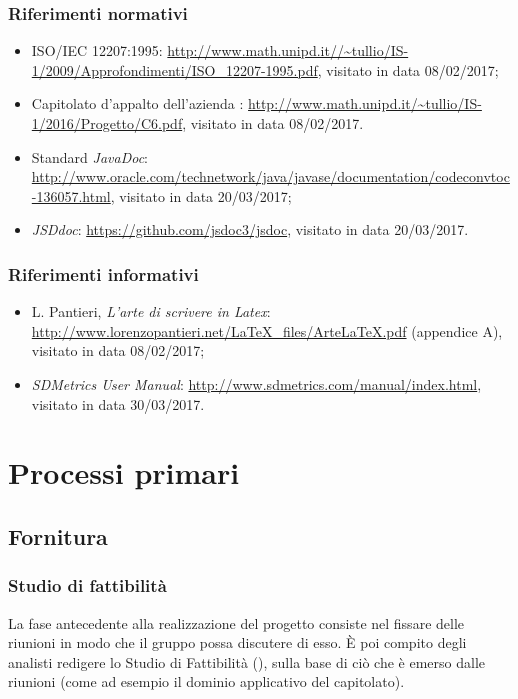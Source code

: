 \subsubsection{Riferimenti normativi}
\begin{itemize}
	\item ISO/IEC 12207:1995: \url{http://www.math.unipd.it//~tullio/IS-1/2009/Approfondimenti/ISO_12207-1995.pdf}, visitato in data 08/02/2017;
	\item Capitolato d'appalto dell'azienda \ZU: \url{http://www.math.unipd.it/~tullio/IS-1/2016/Progetto/C6.pdf}, visitato in data 08/02/2017.
	\item Standard \emph{JavaDoc}: \url{http://www.oracle.com/technetwork/java/javase/documentation/codeconvtoc-136057.html}, visitato in data 20/03/2017;
	\item {} \emph{JSDdoc}: \url{https://github.com/jsdoc3/jsdoc}, visitato in data 20/03/2017.
\end{itemize}

\subsubsection{Riferimenti informativi}
\begin{itemize}
	\item L. Pantieri, \emph{L'arte di scrivere in Latex}: \url{http://www.lorenzopantieri.net/LaTeX_files/ArteLaTeX.pdf} (appendice A), visitato in data 08/02/2017;
	\item \emph{SDMetrics User Manual}: \url{http://www.sdmetrics.com/manual/index.html}, visitato in data 30/03/2017.
\end{itemize}






\section{Processi primari} \label{sec:primari}


\subsection{Fornitura} \label{sec:fornitura}

\subsubsection{Studio di fattibilità}
La fase antecedente alla realizzazione del progetto consiste nel fissare delle riunioni in modo che il gruppo possa discutere di esso. È poi compito degli analisti redigere lo Studio di Fattibilità (\SdF), sulla base di ciò che è emerso dalle riunioni (come ad esempio il dominio applicativo del capitolato).

